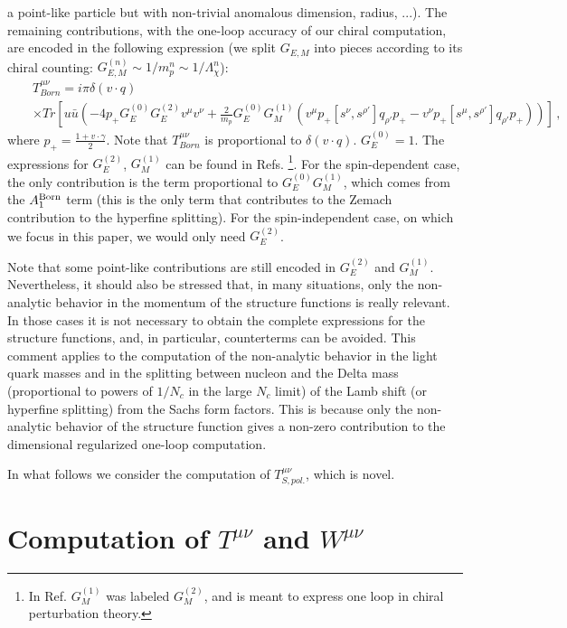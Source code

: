 \documentclass[a4paper,12pt]{article}
\newcommand{\bea}{\begin{eqnarray}}
\newcommand{\eea}{\end{eqnarray}}
\newcommand{\nn}{\nonumber}
\begin{document}
a point-like particle but with non-trivial anomalous dimension, radius, ...). The remaining contributions,  
with the one-loop accuracy of our chiral computation, are encoded in the 
following expression (we split $G_{E,M}$ into pieces according to its chiral counting:
$G_{E,M}^{(n)} \sim 1/m_p^n\sim 1/\Lambda_{\chi}^n$):
\bea
\label{TBorn}
&&T^{\mu\nu}_{Born}
=
i\pi\delta(v\cdot q)
\\
&&
\nn
\times
Tr\left[u\bar u
\left(
-4p_+G_E^{(0)}G_E^{(2)}v^{\mu}v^{\nu}
+\frac{2}{m_p}G_E^{(0)}G_M^{(1)}
\left(
v^{\mu}p_+\left[s^{\nu},s^{\rho'}\right]q_{\rho'}p_+
-
v^{\nu}p_+\left[s^{\mu},s^{\rho'}\right]q_{\rho'}p_+
\right)
\right)
\right]
\,,
\eea
where $p_+=\frac{1+v\cdot \gamma}{2}$. 
Note that $T^{\mu\nu}_{Born}$ is proportional to $\delta(v\cdot q)$. $G_E^{(0)}=1$. The expressions for $G_E^{(2)}$, $G_M^{(1)}$ can be found in 
Refs. \cite{Bernard:1992qa,BKKM,BFHM}\footnote{In Ref. \cite{Pineda:2002as} $G_M^{(1)}$ was labeled $G_M^{(2)}$, and is meant to express 
one loop in chiral perturbation theory.}. For the spin-dependent case, the only contribution is the term proportional to 
$G_E^{(0)}G_M^{(1)}$, which comes from the $A_1^{\rm Born}$ term (this is the only term that contributes to the Zemach contribution 
to the hyperfine splitting). 
For the spin-independent case, on which we focus in this paper, we would only need $G_E^{(2)}$.

Note that some point-like contributions are still encoded in $G_E^{(2)}$ and $G_M^{(1)}$. 
Nevertheless, it should also be stressed that, in many situations, only the non-analytic 
behavior in the momentum of the structure functions is 
really relevant. In those cases it is not necessary to obtain 
the complete expressions for the structure functions, and, in particular,  
counterterms can be avoided. This comment applies to 
the computation of the non-analytic behavior in the light quark masses  
and in the splitting between nucleon and the Delta mass 
(proportional to powers of $1/N_c$ in the large $N_c$ limit) of the Lamb shift 
(or hyperfine splitting) from the Sachs form factors. This is because only the non-analytic behavior of the structure function 
gives a non-zero contribution to the dimensional regularized 
one-loop computation. 

In what follows we consider the computation of $T^{\mu\nu}_{S,pol.}$, which is novel. 


\section{Computation of $T^{\mu\nu}$ and $W ^{\mu\nu}$}
\end{document}
